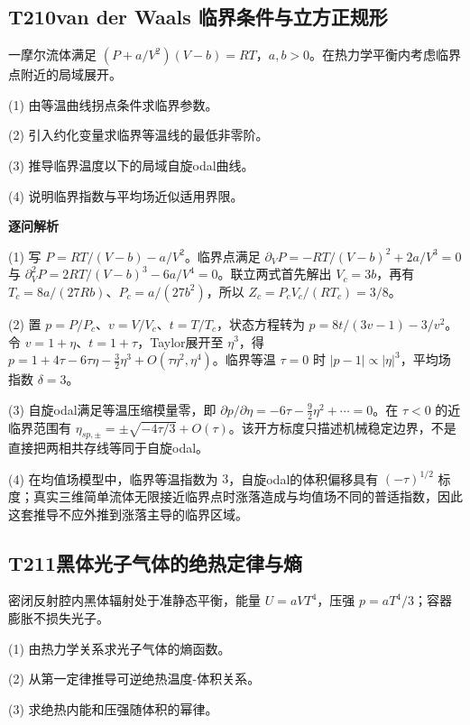 
\subsection*{T210\quad van der Waals 临界条件与立方正规形}

一摩尔流体满足 $(P+a/V^2)(V-b)=RT$，$a,b>0$。在热力学平衡内考虑临界点附近的局域展开。

(1) 由等温曲线拐点条件求临界参数。

(2) 引入约化变量求临界等温线的最低非零阶。

(3) 推导临界温度以下的局域自旋odal曲线。

(4) 说明临界指数与平均场近似适用界限。

\par\textbf{逐问解析}

(1) 写 $P=RT/(V-b)-a/V^2$。临界点满足 $\partial_VP=-RT/(V-b)^2+2a/V^3=0$ 与 $\partial_V^2P=2RT/(V-b)^3-6a/V^4=0$。联立两式首先解出 $V_c=3b$，再有 $T_c=8a/(27Rb)$、$P_c=a/(27b^2)$，所以 $Z_c=P_cV_c/(RT_c)=3/8$。

(2) 置 $p=P/P_c$、$v=V/V_c$、$t=T/T_c$，状态方程转为 $p=8t/(3v-1)-3/v^2$。令 $v=1+\eta$、$t=1+\tau$，Taylor展开至 $\eta^3$，得 $p=1+4\tau-6\tau\eta-\frac32\eta^3+O(\tau\eta^2,\eta^4)$。临界等温 $\tau=0$ 时 $|p-1|\propto|\eta|^3$，平均场指数 $\delta=3$。

(3) 自旋odal满足等温压缩模量零，即 $\partial p/\partial\eta=-6\tau-\frac92\eta^2+\cdots=0$。在 $\tau<0$ 的近临界范围有 $\eta_{sp,\pm}=\pm\sqrt{-4\tau/3}+O(\tau)$。该开方标度只描述机械稳定边界，不是直接把两相共存线等同于自旋odal。

(4) 在均值场模型中，临界等温指数为 $3$，自旋odal的体积偏移具有 $(-\tau)^{1/2}$ 标度；真实三维简单流体无限接近临界点时涨落造成与均值场不同的普适指数，因此这套推导不应外推到涨落主导的临界区域。

\par\medskip

\subsection*{T211\quad 黑体光子气体的绝热定律与熵}

密闭反射腔内黑体辐射处于准静态平衡，能量 $U=aVT^4$，压强 $p=aT^4/3$；容器膨胀不损失光子。

(1) 由热力学关系求光子气体的熵函数。

(2) 从第一定律推导可逆绝热温度-体积关系。

(3) 求绝热内能和压强随体积的幂律。

